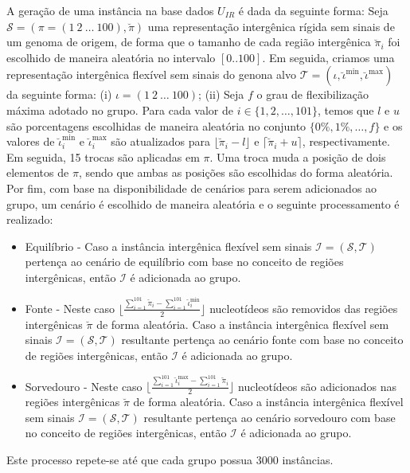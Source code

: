 A geração de uma instância na base dados $U_{IR}$ é dada da seguinte forma: Seja $\mathcal{S} = (\pi =(1~2~\dots~100),\breve\pi)$ uma representação intergênica rígida sem sinais de um genoma de origem, de forma que o tamanho de cada região intergênica $\breve\pi_i$ foi escolhido de maneira aleatória no intervalo $[0..100]$. Em seguida, criamos uma representação intergênica flexível sem sinais do genona alvo $\mathcal{T} = (\iota, \breve\iota^{\min},\breve\iota^{\max})$ da seguinte forma: (i) $\iota =(1~2~\dots~100)$; (ii) Seja $f$ o grau de flexibilização máxima adotado no grupo. Para cada valor de $i \in \{1,2,\dots,101\}$, temos que $l$ e $u$ são porcentagens escolhidas de maneira aleatória no conjunto $\{0\%,1\%,\dots,f\}$ e os valores de $\breve\iota^{\min}_i$ e $\breve\iota^{\max}_i$ são atualizados para $\lfloor\breve\pi_i - l\rfloor$ e $\lceil\breve\pi_i + u\rceil$, respectivamente. Em seguida, 15 trocas são aplicadas em $\pi$. Uma troca muda a posição de dois elementos de $\pi$, sendo que ambas as posições são escolhidas do forma aleatória. Por fim, com base na disponibilidade de cenários para serem adicionados ao grupo, um cenário é escolhido de maneira aleatória e o seguinte processamento é realizado:
\begin{itemize}
  \item Equilíbrio - Caso a instância intergênica flexível sem sinais $\mathcal{I} = (\mathcal{S},\mathcal{T})$ pertença ao cenário de equilíbrio com base no conceito de regiões intergênicas, então $\mathcal{I}$ é adicionada ao grupo.
  \item Fonte - Neste caso $\lfloor\frac{\sum_{i = 1}^{101}\breve\pi_i - \sum_{i = 1}^{101}\breve\iota^{\min}_i}{2}\rfloor$ nucleotídeos são removidos das regiões intergênicas $\breve\pi$ de forma aleatória. Caso a instância intergênica flexível sem sinais $\mathcal{I} = (\mathcal{S},\mathcal{T})$ resultante pertença ao cenário fonte com base no conceito de regiões intergênicas, então $\mathcal{I}$ é adicionada ao grupo.
  \item Sorvedouro - Neste caso $\lfloor\frac{\sum_{i = 1}^{101}\breve\iota^{\max}_i - \sum_{i = 1}^{101}\breve\pi_i}{2}\rfloor$ nucleotídeos são adicionados nas regiões intergênicas $\breve\pi$ de forma aleatória. Caso a instância intergênica flexível sem sinais $\mathcal{I} = (\mathcal{S},\mathcal{T})$ resultante pertença ao cenário sorvedouro com base no conceito de regiões intergênicas, então $\mathcal{I}$ é adicionada ao grupo.
\end{itemize}
Este processo repete-se até que cada grupo possua 3000 instâncias.

